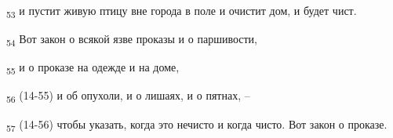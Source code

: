 \begin{tcolorbox}
\textsubscript{53} и пустит живую птицу вне города в поле и очистит дом, и будет чист.
\end{tcolorbox}
\begin{tcolorbox}
\textsubscript{54} Вот закон о всякой язве проказы и о паршивости,
\end{tcolorbox}
\begin{tcolorbox}
\textsubscript{55} и о проказе на одежде и на доме,
\end{tcolorbox}
\begin{tcolorbox}
\textsubscript{56} (14-55) и об опухоли, и о лишаях, и о пятнах, --
\end{tcolorbox}
\begin{tcolorbox}
\textsubscript{57} (14-56) чтобы указать, когда это нечисто и когда чисто. Вот закон о проказе.
\end{tcolorbox}
